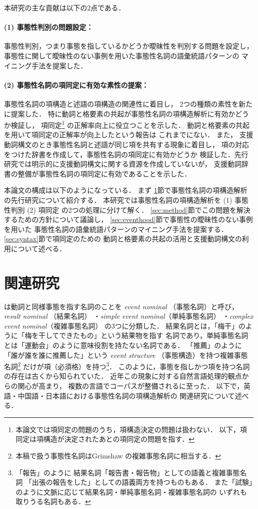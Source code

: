\documentclass[japanese]{jnlp_1.4}
\begin{document}
本研究の主な貢献は以下の2点である．


\paragraph{(1) 事態性判別の問題設定：}
事態性判別，つまり事態を指しているかどうか曖昧性を判別する問題を設定し，
事態性に関して曖昧性のない事例を用いた事態性名詞の語彙統語パターンの
マイニング手法を提案した．

\paragraph{(2) 事態性名詞の項同定に有効な素性の提案：}
事態性名詞の項構造と述語の項構造の関連性に着目し，
2つの種類の素性を新たに提案した．
特に動詞と格要素の共起が事態性名詞の項構造解析に有効かどうか検証し，
項同定\footnote{
	本論文では項同定の問題のうち，項構造決定の問題は扱わない．
	以下，項同定は項構造が決定されたあとの項同定の問題を指す．}
の正解率向上に役立つことを示した．
動詞と格要素の共起を用いて項同定の正解率が向上したという報告は
これまでにない．
また，
支援動詞構文のとき事態性名詞と述語が同じ項を共有する現象に着目し，
項の対応をつけた辞書を作成して，事態性名詞の項同定に有効かどうか
検証した．先行研究では明示的に支援動詞構文に関する資源を作成していないが，
支援動詞辞書の整備が事態性名詞の項同定に有効であることを示した．

本論文の構成は以下のようになっている．
まず
\ref{sec:relatedwork}節で事態性名詞の項構造解析の先行研究について紹介する．
本研究では事態性名詞の項構造解析を
(1) 事態性判別
(2) 項同定
の2つの処理に分けて解く．
\ref{sec:method}節でこの問題を解決するための方針について議論し，
\ref{sec:eventhood}節で事態性の曖昧性のない事例を用いた
事態性名詞の語彙統語パターンのマイニング手法を提案する．
\ref{sec:syntax}節で項同定のための
動詞と格要素の共起の活用と支援動詞構文の利用について述べる．


\section{関連研究}
\label{sec:relatedwork}

\cite{grimshaw:1990}は動詞と同様事態を指す名詞のことを
\emph{event nominal} （事態名詞）と呼び，
\emph{result nominal} （結果名詞）
・\emph{simple event nominal}（単純事態名詞）
・\emph{complex event nominal}（複雑事態名詞）
の3つに分類した．
結果名詞とは，「梅干」のように「梅を干してできたもの」という結果物を指す
名詞であり，単純事態名詞とは「運動会」のように意味役割を持たない名詞である．
「推薦」のように「誰が誰を誰に推薦した」という \emph{event structure}
（事態構造）を持つ複雑事態名詞\footnote{
	本稿で扱う事態性名詞はGrimshaw の複雑事態名詞に相当する．}
だけが項（必須格）を持つ\footnote{
	「報告」のように
	結果名詞「報告書・報告物」としての語義と複雑事態名詞
	「出張の報告をした」としての語義両方を持つものもある．
	また「試験」のように文脈に応じて結果名詞・単純事態名詞・複雑事態名詞の
	いずれも取りうる名詞もある．}．
このように，事態を指しかつ項を持つ名詞の存在は古くから知られていた．
近年この現象に対する自然言語処理的観点からの関心が高まり，
複数の言語でコーパスが整備されるに至った．
以下で，英語・中国語・日本語における事態性名詞の項構造解析の
関連研究について述べる．
\end{document}
